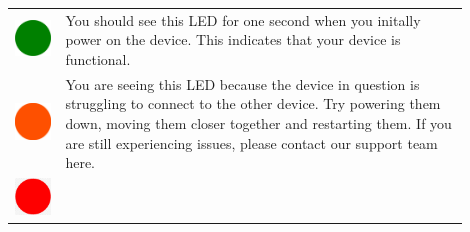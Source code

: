 			\begin{tabular}{ m{0.1\linewidth} m{0.8\linewidth} } 

				\vspace{2em}
				\includegraphics[width=0.5\linewidth]{graphics/green_circle.png}
				
				& You should see this LED for one second when you initally power on the device. This indicates that your device is functional. \\ 

				\vspace{2em}
				\includegraphics[width=0.5\linewidth]{graphics/orange_circle.png}
				
				&  You are seeing this LED because the device in question is struggling to connect to the other device. Try powering them down, moving them closer together and restarting them. If you are still experiencing issues, please contact our support team here. \\ 

				\vspace{2em}
				\includegraphics[width=0.5\linewidth]{graphics/red_circle.png}
				

\end{tabular}

